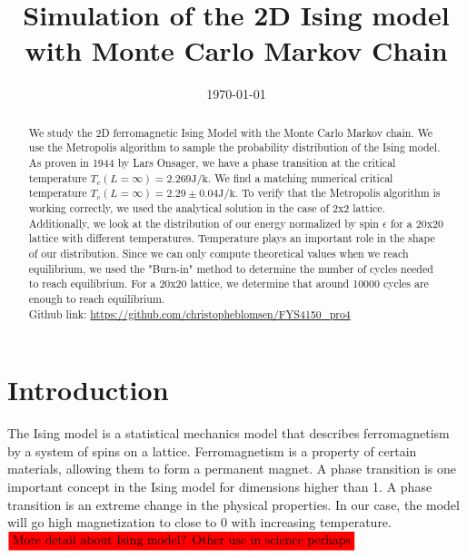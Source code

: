 \documentclass[english,notitlepage,reprint,nofootinbib]{revtex4-2}  %
\begin{document}
	
	\title{Simulation of the 2D Ising model with Monte Carlo Markov Chain}  %
	\author{} %
	\date{\today}                             %
	\noaffiliation                            %
	
	\begin{abstract}
We study the 2D ferromagnetic Ising Model with the Monte Carlo Markov chain. We
use the Metropolis algorithm to sample the probability distribution of the Ising
model.
	As proven in 1944 by Lars Onsager\cite{PhysRev.65.117}, we have a phase
transition at the critical temperature $T_c(L=\infty)=2.269 \mathrm{J / k}$. We
find a matching numerical critical temperature
$T_c(L=\infty) = 2.29 \pm 0.04 \mathrm{J / k}$. To verify that the Metropolis
algorithm is working correctly, we used the analytical solution in the case  of
2x2 lattice. Additionally, we look at the distribution of our energy normalized
by spin $\epsilon$ for a 20x20 lattice with different temperatures. Temperature plays an important role in the shape of our distribution. Since
we can only compute theoretical values when we reach equilibrium, we used the
"Burn-in"  method to determine the number of cycles needed to reach equilibrium.
For a 20x20 lattice, we determine that around 10000 cycles are enough to reach
equilibrium.
\\
\newline
Github link: \href{https://github.com/christopheblomsen/FYS4150_pro4}{https://github.com/christopheblomsen/FYS4150\_pro4}
\end{abstract}
	\maketitle	
	
	
	\section{Introduction} \label{sec:introduction}
	The Ising model is a statistical mechanics model that describes ferromagnetism by a system of spins on a lattice.
	Ferromagnetism is a property of certain materials, allowing them to form a permanent magnet. A phase transition is one important concept in the Ising model for dimensions
	higher than 1. A phase transition is an extreme change in the physical properties. In our case, the model will go high magnetization to close to
	0 with increasing temperature. $\colorbox{red}{More detail about Ising model? Other use in science perhaps}$\\
\end{document}
